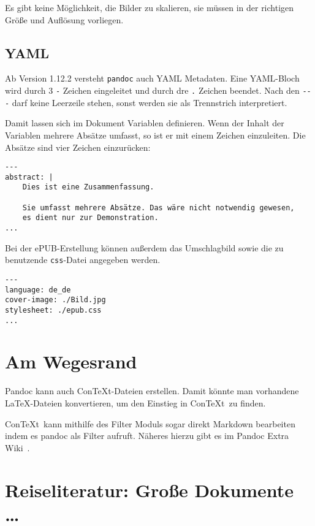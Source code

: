 \documentclass[11pt,ngerman,a4paper]{article}
\begin{document}
Es gibt keine Möglichkeit, die Bilder zu skalieren, sie müssen in der
richtigen Größe und Auflösung vorliegen.

\subsection{YAML}\label{yaml}

Ab Version 1.12.2 versteht \texttt{pandoc} auch YAML Metadaten. Eine
YAML-Bloch wird durch 3 \texttt{-} Zeichen eingeleitet und durch dre
\texttt{.} Zeichen beendet. Nach den \texttt{-{}-{}-} darf keine
Leerzeile stehen, sonst werden sie als Trennstrich interpretiert.

Damit lassen sich im Dokument Variablen definieren. Wenn der Inhalt der
Variablen mehrere Absätze umfasst, so ist er mit einem
\texttt{\textbar{}} Zeichen einzuleiten. Die Absätze sind vier Zeichen
einzurücken:

\begin{verbatim}
---
abstract: |
    Dies ist eine Zusammenfassung.

    Sie umfasst mehrere Absätze. Das wäre nicht notwendig gewesen,
    es dient nur zur Demonstration.
...
\end{verbatim}

Bei der ePUB-Erstellung können außerdem das Umschlagbild sowie die zu
benutzende \texttt{css}-Datei angegeben werden.

\begin{verbatim}
---
language: de_de
cover-image: ./Bild.jpg
stylesheet: ./epub.css
...
\end{verbatim}

\section{Am Wegesrand}\label{am-wegesrand}

Pandoc kann auch ConTeXt-Dateien erstellen. Damit könnte man vorhandene
LaTeX-Dateien konvertieren, um den Einstieg in ConTeXt~zu finden.

ConTeXt~kann mithilfe des Filter Moduls sogar direkt Markdown bearbeiten
indem es pandoc als Filter aufruft. Näheres hierzu gibt es im Pandoc
Extra Wiki~\autocite{pandoc-extra}.

\section{Reiseliteratur: Große Dokumente
\ldots{}}\label{reiseliteratur-grouxdfe-dokumente}
\end{document}
